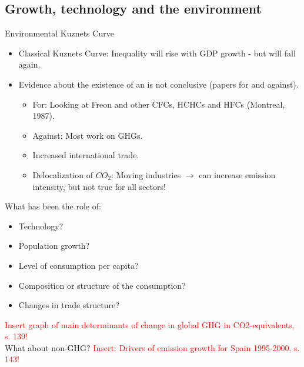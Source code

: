 \subsection{Growth, technology and the environment} %
\begin{multicols}{2}
 Environmental Kuznets Curve
 \begin{itemize}
  \item Classical Kuznets Curve: Inequality will rise with GDP growth - but will fall again.
  \item Evidence about the existence of an  is not conclusive (papers for and against).
        \begin{itemize}
         \item For: Looking at Freon and other CFCs, HCHCs and HFCs (Montreal, 1987).
         \item Against: Most work on GHGs.
         \item Increased international trade.
         \item Delocalization of $CO_2$: Moving industries $\rightarrow$ can increase emission intensity, but not true for all sectors!
        \end{itemize}
 \end{itemize}
 What has been the role of:
 \begin{itemize}
  \item Technology?
  \item Population growth?
  \item Level of consumption per capita?
  \item Composition or structure of the consumption?
  \item Changes in trade structure?
 \end{itemize}
\end{multicols}\noindent
\textcolor{red}{Insert graph of main determinants of change in global GHG in CO2-equivalents, s. 139!}\\
What about non-GHG?
\textcolor{red}{Insert: Drivers of emission growth for Spain 1995-2000, s. 143!}\\


